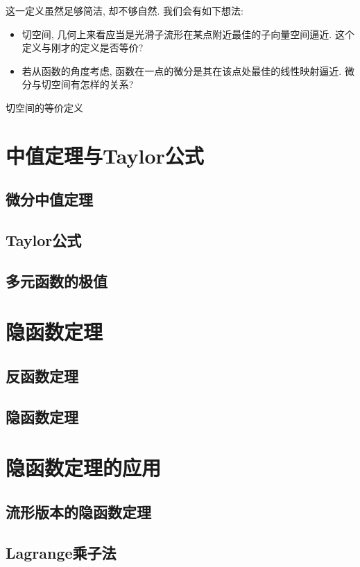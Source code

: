 这一定义虽然足够简洁, 却不够自然. 我们会有如下想法: 
\begin{itemize}
	\item 切空间, 几何上来看应当是光滑子流形在某点附近最佳的子向量空间逼近. 这个定义与刚才的定义是否等价? 
	\item 若从函数的角度考虑, 函数在一点的微分是其在该点处最佳的线性映射逼近. 微分与切空间有怎样的关系? 
\end{itemize}

\begin{proposition}{切空间的等价定义}
	
\end{proposition}

\newpage
\section{中值定理与Taylor公式}

\subsection{微分中值定理}

\subsection{Taylor公式}

\subsection{多元函数的极值}

\newpage
\section{隐函数定理}

\subsection{反函数定理}

\subsection{隐函数定理}


\newpage
\section{隐函数定理的应用}

\subsection{流形版本的隐函数定理}

\subsection{Lagrange乘子法}